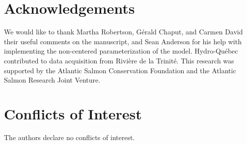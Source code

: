 \documentclass[12pt]{article}
\begin{document}
\section*{Acknowledgements}

We would like to thank Martha Robertson, G\'{e}rald Chaput, and Carmen David
their useful comments on the manuscript, and Sean Anderson for his help with
implementing the non-centered parameterization of the model. Hydro-Québec
contributed to data acquisition from Rivière de la Trinité. This research was
supported by the Atlantic Salmon Conservation Foundation and the Atlantic
Salmon Research Joint Venture.

\section*{Conflicts of Interest}

The authors declare no conflicts of interest.
 


%
\end{document}
